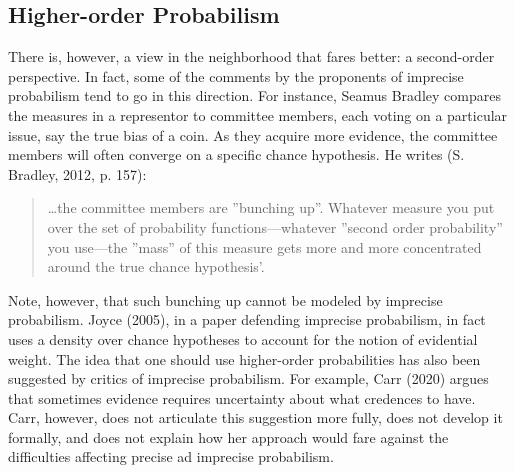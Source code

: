 \documentclass[
  10pt,
  dvipsnames,enabledeprecatedfontcommands]{scrartcl}
\begin{document}
\hypertarget{higher-order-probabilism}{%
\subsection{Higher-order Probabilism}\label{higher-order-probabilism}}

There is, however, a view in the neighborhood that fares better: a
second-order perspective. In fact, some of the comments by the
proponents of imprecise probabilism tend to go in this direction. For
instance, Seamus Bradley compares the measures in a representor to
committee members, each voting on a particular issue, say the true bias
of a coin. As they acquire more evidence, the committee members will
often converge on a specific chance hypothesis. He writes (S. Bradley,
2012, p. 157):

\begin{quote}
\dots the committee members are ''bunching up''. Whatever measure you put over the set of probability functions---whatever ''second order probability'' you use---the ''mass'' of this measure gets more and more concentrated around the true chance hypothesis'.
\end{quote}

\noindent Note, however, that such bunching up cannot be modeled by
imprecise probabilism. Joyce (2005), in a paper defending imprecise
probabilism, in fact uses a density over chance hypotheses to account
for the notion of evidential weight. The idea that one should use
higher-order probabilities has also been suggested by critics of
imprecise probabilism. For example, Carr (2020) argues that sometimes
evidence requires uncertainty about what credences to have. Carr,
however, does not articulate this suggestion more fully, does not
develop it formally, and does not explain how her approach would fare
against the difficulties affecting precise ad imprecise probabilism.
\end{document}
